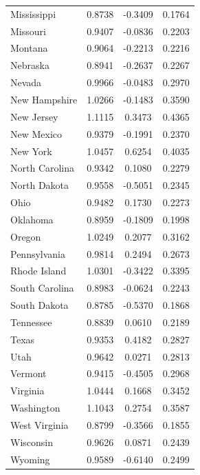 \begin{table}[H]
\begin{tabular}{lccc}
        Mississippi & 0.8738 & -0.3409 & 0.1764 \\
        Missouri & 0.9407 & -0.0836 & 0.2203 \\
        Montana & 0.9064 & -0.2213 & 0.2216 \\
        Nebraska & 0.8941 & -0.2637 & 0.2267 \\
        Nevada & 0.9966 & -0.0483 & 0.2970 \\
        New Hampshire & 1.0266 & -0.1483 & 0.3590 \\
        New Jersey & 1.1115 & 0.3473 & 0.4365 \\
        New Mexico & 0.9379 & -0.1991 & 0.2370 \\
        New York & 1.0457 & 0.6254 & 0.4035 \\
        North Carolina & 0.9342 & 0.1080 & 0.2279 \\
        North Dakota & 0.9558 & -0.5051 & 0.2345 \\
        Ohio & 0.9482 & 0.1730 & 0.2273 \\
        Oklahoma & 0.8959 & -0.1809 & 0.1998 \\
        Oregon & 1.0249 & 0.2077 & 0.3162 \\
        Pennsylvania & 0.9814 & 0.2494 & 0.2673 \\
        Rhode Island & 1.0301 & -0.3422 & 0.3395 \\
        South Carolina & 0.8983 & -0.0624 & 0.2243 \\
        South Dakota & 0.8785 & -0.5370 & 0.1868 \\
        Tennessee & 0.8839 & 0.0610 & 0.2189 \\
        Texas & 0.9353 & 0.4182 & 0.2827 \\
        Utah & 0.9642 & 0.0271 & 0.2813 \\
        Vermont & 0.9415 & -0.4505 & 0.2968 \\
        Virginia & 1.0444 & 0.1668 & 0.3452 \\
        Washington & 1.1043 & 0.2754 & 0.3587 \\
        West Virginia & 0.8799 & -0.3566 & 0.1855 \\
        Wisconsin & 0.9626 & 0.0871 & 0.2439 \\
        Wyoming & 0.9589 & -0.6140 & 0.2499 \\
        \bottomrule
    \end{tabular}
\end{table}
